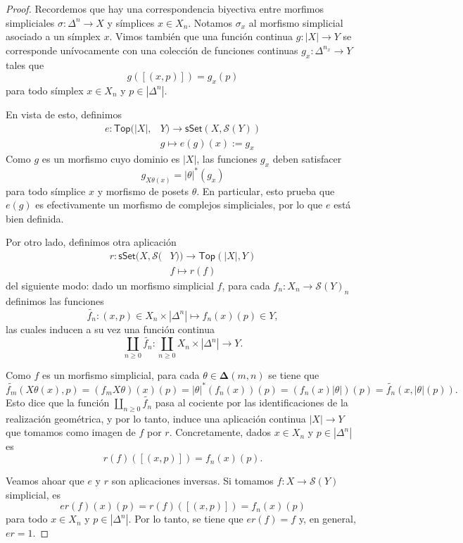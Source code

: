 \documentclass[11pt]{report}
\theoremstyle{colored}
\newcommand{\cat}[1]{\mathsf{#1}}
\renewcommand{\ss}[1]{\Delta^{#1}}
\newcommand{\ordcat}{\boldsymbol{\Delta}}
\begin{document}
\begin{proof} Recordemos que hay una correspondencia biyectiva entre morfimos simpliciales $\sigma: \ss{n} \to X$ y símplices $x \in X_n$. Notamos $\sigma_x$ al morfismo simplicial asociado a un símplex $x$. Vimos también que una función continua $g : |X| \to Y$ se corresponde unívocamente con una colección de funciones continuas $g_x : \ss{n_x} \to Y$ tales que 
\[
g([(x,p)]) = g_x(p)
\]
para todo símplex $x \in X_n$ y $p \in |\ss{n}|$. 

En vista de esto, definimos
\begin{align*}
e : \cat{Top}(|X|,&Y) \to \cat{sSet}(X,\mathcal{S}(Y))\\
& g \longmapsto e(g)(x) := g_x
\end{align*}
Como $g$ es un morfismo cuyo dominio es $|X|$, las funciones $g_x$ deben satisfacer
\[
g_{X\theta(x)} = |\theta|^*(g_x)
\]
para todo símplice $x$ y morfismo de posets $\theta$. En particular, esto prueba que $e(g)$ es efectivamente un morfismo de complejos simpliciales, por lo que $e$ está bien definida.

Por otro lado, definimos otra aplicación
\begin{align*}
r : \cat{sSet}(X,\mathcal{S}(&Y)) \to \cat{Top}(|X|,Y)\\
& f \longmapsto r(f)
\end{align*}
del siguiente modo: dado un morfismo simplicial $f$, para cada $f_n : X_n \to \mathcal{S}(Y)_n$ definimos las funciones
\[
\widetilde{f_n} : (x,p) \in X_n \times |\ss{n}| \mapsto f_n(x)(p) \in Y,
\]
las cuales inducen a su vez una función continua
\[
\coprod_{n \geq 0} \widetilde{f_n} : \coprod_{n \geq 0} X_n \times |\ss{n}| \to Y.
\]

Como $f$ es un morfismo simplicial, para cada $\theta \in \ordcat(m,n)$ se tiene que
\[
\widetilde{f_m}(X\theta(x), p) = (f_mX\theta)(x)(p) = |\theta|^*(f_n(x))(p) = (f_n(x) |\theta|)(p) = \widetilde{f_n}(x,|\theta|(p)).
\]
Esto dice que la función $\coprod_{n \geq 0} \widetilde{f_n}$ pasa al cociente por las identificaciones de la realización geométrica, y por lo tanto, induce una aplicación continua $|X| \to Y$ que tomamos como imagen de $f$ por $r$. Concretamente, dados $x \in X_n$ y $p \in |\ss{n}|$ es
\[
r(f)([(x,p)]) = f_n(x)(p).
\]

Veamos ahoar que $e$ y $r$ son aplicaciones inversas. Si tomamos $f : X \to \mathcal{S}(Y)$ simplicial, es
\[
er(f)(x)(p) = r(f)([(x,p)]) = f_n(x)(p)
\]
para todo $x \in X_n$ y $p \in |\ss{n}|$. Por lo tanto, se tiene que $e r(f) = f$ y, en general, $e r = 1$.


\end{proof}
\end{document}
